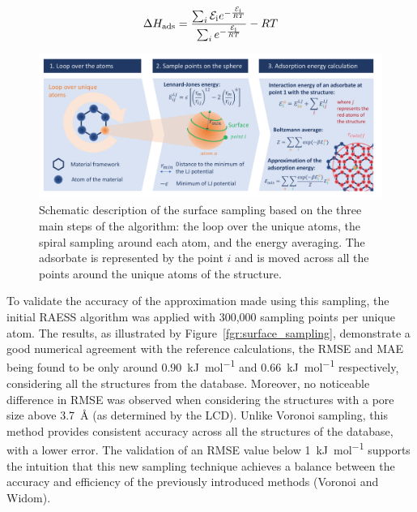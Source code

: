 \documentclass[main]{subfiles}
\begin{document}
\begin{equation}\label{eq:ads_enthalpy_3}
  \Delta H_{\text{ads}} = \dfrac{\sum_i \mathcal{E}_{\text{i}}e^{-\frac{\mathcal{E}_{\text{i}}}{RT}}}{\sum_i e^{-\frac{\mathcal{E}_{\text{i}}}{RT}}} - RT
\end{equation}

\begin{figure}[ht]
\centering
  \includegraphics[clip, trim=0.6cm 0.74cm 0.78cm 0.6cm,width=0.95\linewidth]{figures/3-fastsim/Principe_screening.pdf}
  \caption{Schematic description of the surface sampling based on the three main steps of the algorithm: the loop over the unique atoms, the spiral sampling around each atom, and the energy averaging. The adsorbate is represented by the point $i$ and is moved across all the points around the unique atoms of the structure.}\label{fgr:principle}
\end{figure}

To validate the accuracy of the approximation made using this sampling, the initial RAESS algorithm was applied with 300,000 sampling points per unique atom. The results, as illustrated by Figure~\ref{fgr:surface_sampling}, demonstrate a good numerical agreement with the reference calculations, {the RMSE and MAE being found to be only around \SI{0.90}{\kilo\joule\per\mole} and \SI{0.66}{\kilo\joule\per\mole} respectively}, considering all the structures from the database. Moreover, no noticeable difference in RMSE was observed when considering the structures with a pore size above \SI{3.7}{\angstrom} (as determined by the LCD). Unlike Voronoi sampling, this method provides consistent accuracy across all the structures of the database, with a lower error. The validation of an {RMSE} value below \SI{1}{\kilo\joule\per\mole} supports the intuition that this new sampling technique achieves a balance between the accuracy and efficiency of the previously introduced methods (Voronoi and Widom).
\end{document}
